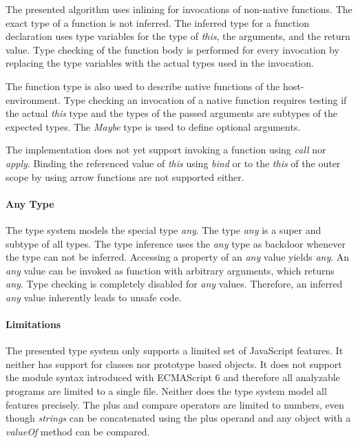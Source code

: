 The presented algorithm uses inlining for invocations of non-native functions. The exact type of a function is  not inferred. The inferred type for a function declaration uses type variables for the type of \textit{this}, the arguments, and the return value. Type checking of the function body is performed for every invocation by replacing the type variables with the actual types used in the invocation. 

The function type is also used to describe native functions of the host-environment. Type checking an invocation of a native function requires testing if the actual \textit{this} type and the types of the passed arguments are subtypes of the expected types. The \textit{Maybe} type is used to define optional arguments.

The implementation does not yet support invoking a function using \textit{call} nor \textit{apply}. Binding the referenced value of \textit{this} using \textit{bind} or to the \textit{this} of the outer scope by using arrow functions are not supported either.

\paragraph{Any Type}
The type system models the special type \textit{any}. The type \textit{any} is a super and subtype of all types. The type inference uses the \textit{any} type as backdoor whenever the type can not be inferred. Accessing a property of an \textit{any} value yields \textit{any}. An \textit{any} value can be invoked as function with arbitrary arguments, which returns \textit{any}. Type checking is completely disabled for \textit{any} values. Therefore, an inferred \textit{any} value inherently leads to unsafe code.

\paragraph{Limitations}
The presented type system only supports a limited set of JavaScript features. It neither has support for classes nor prototype based objects. It does not support the module syntax introduced with ECMAScript 6 and therefore all analyzable programs are limited to a single file. Neither does the type system model all features precisely. The plus and compare operators are limited to numbers, even though \textit{strings} can be concatenated using the plus operand and any object with a \textit{valueOf} method can be compared. 
